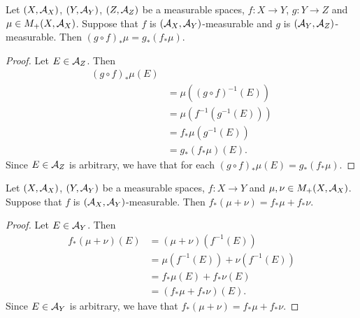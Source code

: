 \documentclass{book}
\begin{document}
\begin{ex} 
	Let $(X, \mathcal{A}_X)$, $(Y, \mathcal{A}_Y)$, $(Z, \mathcal{A}_Z)$ be a measurable spaces, $f: X \rightarrow Y$, $g: Y \rightarrow Z$ and $\mu \in M_+(X, \mathcal{A}_X)$. Suppose that $f$ is $(\mathcal{A}_X, \mathcal{A}_Y)$-measurable and $g$ is $(\mathcal{A}_Y, \mathcal{A}_Z)$-measurable. Then $(g \circ f)_*\mu = g_*(f_*\mu)$. 
\end{ex}

\begin{proof}
	Let $E \in \mathcal{A}_Z$. Then 
	\begin{align*}
		(g \circ f)_*\mu(E) \\
		& = \mu((g \circ f)^{-1}(E)) \\
		& = \mu(f^{-1}(g^{-1}(E))) \\
		& = f_*\mu(g^{-1}(E)) \\
		& = g_*(f_*\mu)(E).
	\end{align*}
	Since $E \in \mathcal{A}_Z$ is arbitrary, we have that for each $(g \circ f)_*\mu(E) = g_*(f_*\mu)$.
\end{proof}

\begin{ex} 
	Let $(X, \mathcal{A}_X)$, $(Y, \mathcal{A}_Y)$ be a measurable spaces, $f: X \rightarrow Y$ and $\mu, \nu \in M_+(X, \mathcal{A}_X)$. Suppose that $f$ is $(\mathcal{A}_X, \mathcal{A}_Y)$-measurable. Then $f_*(\mu + \nu) = f_*\mu + f_*\nu$.
\end{ex}

\begin{proof}
	Let $E \in \mathcal{A}_Y$. Then 
	\begin{align*}
		f_*(\mu + \nu)(E)
		& = (\mu + \nu)(f^{-1}(E)) \\
		& = \mu(f^{-1}(E)) + \nu(f^{-1}(E)) \\
		& = f_*\mu(E) + f_*\nu(E) \\
		& = (f_*\mu + f_*\nu)(E).
	\end{align*}
	Since $E \in \mathcal{A}_Y$ is arbitrary, we have that $f_*(\mu + \nu) = f_*\mu + f_*\nu$.
\end{proof}




















	
	
\end{document}

